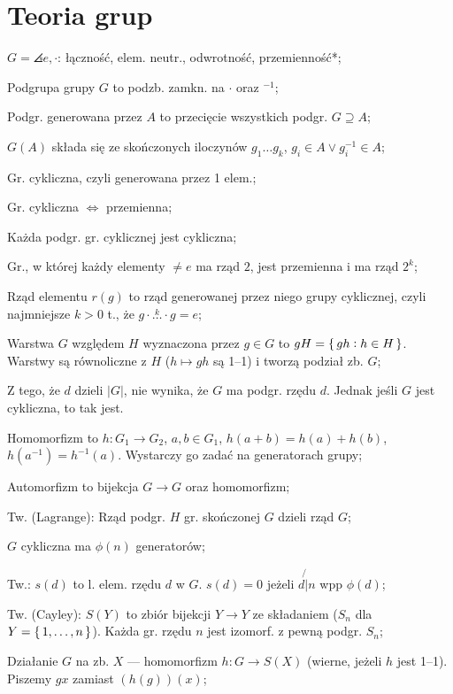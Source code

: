 \section{Teoria grup}

\entry
$G = \angles{e, \cdot}$: łączność, elem. neutr., odwrotność, przemienność*;

\entry
Podgrupa grupy $G$ to podzb. zamkn. na $\cdot$ oraz $^{-1}$;

\entry
Podgr. generowana przez $A$ to przecięcie wszystkich podgr. $G \supseteq A$;

\entry
$G(A)$ składa się ze skończonych iloczynów $g_1\dots g_k$,
  $g_i\in A \lor g_i^{-1} \in A$;

\entry
Gr. cykliczna, czyli generowana przez 1 elem.;

\entry
Gr. cykliczna $\Leftrightarrow$ przemienna;

\entry
Każda podgr. gr. cyklicznej jest cykliczna;

\entry
Gr., w której każdy elementy $\neq e$ ma rząd $2$, jest przemienna
  i ma rząd $2^k$;

\entry
Rząd elementu $r(g)$ to rząd generowanej przez niego grupy cyklicznej, czyli
  najmniejsze $k > 0$ t., że $g\cdot\overset{k}{\ldots}\cdot g=e$;

\entry
Warstwa $G$ względem $H$ wyznaczona przez $g\in G$ to
  $gH = \set{gh : h \in H}$. Warstwy są równoliczne z $H$
  ($h \mapsto gh$ są 1--1) i tworzą podział zb. $G$;

\entry
Z tego, że $d$ dzieli $|G|$, nie wynika, że $G$ ma podgr. rzędu $d$. Jednak
  jeśli $G$ jest cykliczna, to tak jest.

\entry
Homomorfizm to $h: G_1 \to G_2$, $a,b\in G_1$, $h(a+b)=h(a)+h(b)$,
  $h(a^{-1}) = h^{-1}(a)$. Wystarczy go zadać na generatorach grupy;

\entry
Automorfizm to bijekcja $G\to G$ oraz homomorfizm;

\entry
Tw. (Lagrange): Rząd podgr. $H$ gr. skończonej $G$ dzieli rząd $G$;

\entry
$G$ cykliczna ma $\phi(n)$ generatorów;

\entry
Tw.: $s(d)$ to l. elem. rzędu $d$ w $G$. $s(d) = 0$ jeżeli $d \not{|} n$
  wpp $\phi(d)$;

\entry
Tw. (Cayley): $S(Y)$ to zbiór bijekcji $Y \rightarrow Y$ ze składaniem
  ($S_n$ dla $Y=\set{1,\dots,n}$). Każda gr. rzędu $n$ jest izomorf. z pewną
  podgr. $S_n$;

\entry
Działanie $G$ na zb. $X$ --- homomorfizm $h: G \rightarrow S(X)$ (wierne,
jeżeli $h$ jest 1--1). Piszemy $gx$ zamiast $(h(g))(x)$;

